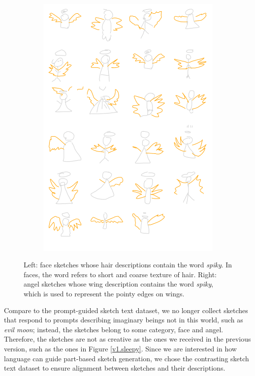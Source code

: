 \begin{figure}[!h]
\begin{subfigure}{.5\textwidth}
\includegraphics[width=\linewidth]{data_collection/summary/spikyangel.png}  
\end{subfigure}
\caption{Left: face sketches whose hair descriptions contain the word \textit{spiky}. In faces, the word refers to short and coarse texture of hair. Right: angel sketches whose wing description contains the word \textit{spiky}, which is used to represent the pointy edges on wings.}
\label{datasummary.spiky}
\end{figure}

Compare to the prompt-guided sketch text dataset, we no longer collect sketches that respond to prompts describing imaginary beings not in this world, such as \textit{evil moon}; instead, the sketches belong to some category, face and angel. Therefore, the sketches are not as creative as the ones we received in the previous version, such as the ones in Figure \ref{v1.sleepy}. Since we are interested in how language can guide part-based sketch generation, we chose the contrasting sketch text dataset to ensure alignment between sketches and their descriptions.       